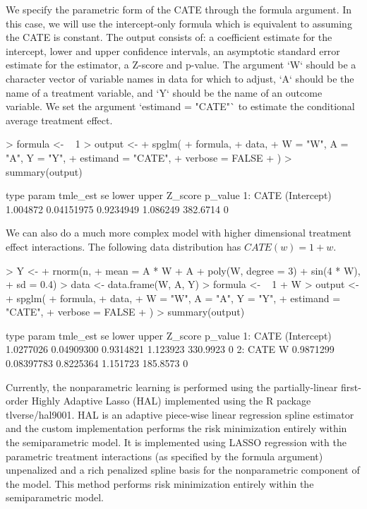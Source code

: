 \documentclass{article}
\begin{document}
We specify the parametric form of the CATE through the formula argument. In this case, we will use the intercept-only formula which is equivalent to assuming the CATE is constant.  The output consists of:
a coefficient estimate for the intercept, lower and upper confidence intervals, an asymptotic standard error estimate for the estimator, a Z-score and p-value. The argument `W` should be a character vector of variable names in data for which to adjust, `A` should be the name of a treatment variable, and `Y` should be the name of an outcome variable. We set the argument `estimand = "CATE"` to estimate the conditional average treatment effect.
\begin{Schunk}
\begin{Sinput}
> formula <- ~ 1
> output <-
+   spglm(
+     formula,
+     data,
+     W = "W", A = "A", Y = "Y",
+     estimand = "CATE",
+     verbose = FALSE
+   )
> summary(output) 
\end{Sinput}
\begin{Soutput}
   type       param tmle_est         se     lower    upper  Z_score p_value
1: CATE (Intercept) 1.004872 0.04151975 0.9234949 1.086249 382.6714       0
\end{Soutput}
\end{Schunk}
We can also do a much more complex model with higher dimensional treatment effect interactions. The following data distribution has $CATE(w) = 1 + w$.  
\begin{Schunk}
\begin{Sinput}
> Y <-
+   rnorm(n,
+         mean = A * W + A + poly(W, degree = 3) + sin(4 * W),
+         sd = 0.4)
> data <- data.frame(W, A, Y)
> formula <- ~ 1 + W
> output <-
+   spglm(
+     formula,
+     data,
+     W = "W", A = "A", Y = "Y",
+     estimand = "CATE",
+     verbose = FALSE
+   )
> summary(output) 
\end{Sinput}
\begin{Soutput}
   type       param  tmle_est         se     lower    upper  Z_score p_value
1: CATE (Intercept) 1.0277026 0.04909300 0.9314821 1.123923 330.9923       0
2: CATE           W 0.9871299 0.08397783 0.8225364 1.151723 185.8573       0
\end{Soutput}
\end{Schunk}


Currently, the nonparametric learning is performed using the partially-linear first-order Highly Adaptive Lasso (HAL) implemented using the R package tlverse/hal9001. HAL is an adaptive piece-wise linear regression spline estimator and the custom implementation performs the risk minimization entirely within the semiparametric model. It is implemented using LASSO regression with the parametric treatment interactions (as specified by the formula argument) unpenalized and a rich penalized spline basis for the nonparametric component of the model. This method performs risk minimization entirely within the semiparametric model.
\end{document}
